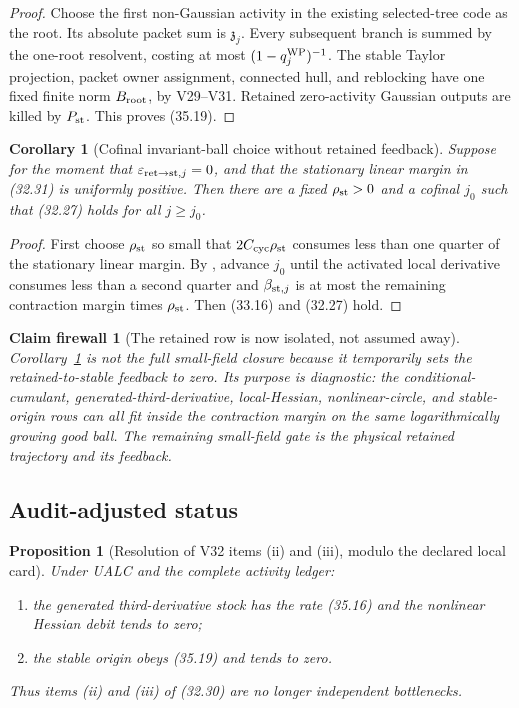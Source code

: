 \documentclass[11pt,oneside]{book}
\newtheorem{proposition}[theorem]{Proposition}
\newtheorem{corollary}[theorem]{Corollary}
\newtheorem{firewall}[theorem]{Claim firewall}
\theoremstyle{definition}
\theoremstyle{remark}
\begin{document}
\begin{proof}
Choose the first non-Gaussian activity in the existing selected-tree
code as the root.  Its absolute packet sum is
\({\mathfrak z}_j\).  Every subsequent branch is summed by the
one-root resolvent, costing at most
\((1-q_j^{\rm WP})^{-1}\).  The stable Taylor projection, packet
owner assignment, connected hull, and reblocking have one fixed
finite norm \(B_{\rm root}\), by V29--V31.  Retained zero-activity
Gaussian outputs are killed by \(P_{\rm st}\).  This proves (35.19).
\end{proof}

\begin{corollary}[Cofinal invariant-ball choice without retained
feedback]
\label{cor:e8v35-origin-ball}
Suppose for the moment that
\(\varepsilon_{{\rm ret}\to{\rm st},j}=0\), and that the stationary
linear margin in (32.31) is uniformly positive.  Then there are a
fixed \(\rho_{\rm st}>0\) and a cofinal \(j_0\) such that (32.27)
holds for all \(j\geq j_0\).
\end{corollary}

\begin{proof}
First choose \(\rho_{\rm st}\) so small that
\(2C_{\rm cyc}\rho_{\rm st}\) consumes less than one quarter of the
stationary linear margin.  By
, advance \(j_0\) until the
activated local derivative consumes less than a second quarter and
\(\beta_{{\rm st},j}\) is at most the remaining contraction margin
times \(\rho_{\rm st}\).  Then (33.16) and (32.27) hold.
\end{proof}

\begin{firewall}[The retained row is now isolated, not assumed away]
\label{fire:e8v35-retained}
Corollary~\ref{cor:e8v35-origin-ball} is not the full small-field
closure because it temporarily sets the retained-to-stable feedback
to zero.  Its purpose is diagnostic: the conditional-cumulant,
generated-third-derivative, local-Hessian, nonlinear-circle, and
stable-origin rows can all fit inside the contraction margin on the
same logarithmically growing good ball.  The remaining small-field
gate is the physical retained trajectory and its feedback.
\end{firewall}

\subsection{Audit-adjusted status}

\begin{proposition}[Resolution of V32 items (ii) and (iii), modulo
the declared local card]
\label{prop:e8v35-items-ii-iii}
Under UALC and the complete activity ledger:
\begin{enumerate}
\item the generated third-derivative stock has the rate (35.16) and
      the nonlinear Hessian debit tends to zero;
\item the stable origin obeys (35.19) and tends to zero.
\end{enumerate}
Thus items (ii) and (iii) of (32.30) are no longer independent
bottlenecks.
\end{proposition}
\end{document}
